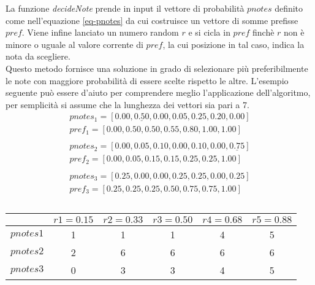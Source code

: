 La funzione \emph{decideNote} prende in input il vettore di probabilità
$pnotes$ definito come nell'equazione \ref{eq-pnotes} da cui costruisce
un vettore di somme prefisse $pref$. Viene infine lanciato un numero
random $r$ e si cicla in $pref$ finchè $r$ non è minore o uguale al
valore corrente di $pref$, la cui posizione in tal caso, indica la nota
da scegliere.\\
Questo metodo fornisce una soluzione in grado di selezionare più
preferibilmente le note con maggiore probabilità di essere scelte
rispetto le altre. L'esempio seguente può essere d'aiuto per comprendere
meglio l'applicazione dell'algoritmo, per semplicità si assume che la
lunghezza dei vettori sia pari a 7.
\begin{align*}
pnotes_1 = [0.00,\underline{0.50},0.00,0.05,0.25,0.20,0.00]\\
pref_1   = [0.00,0.50,0.50,0.55,0.80,1.00,1.00]\\\\
pnotes_2 = [0.00,0.05,0.10,0.00,0.10,0.00,\underline{0.75}]\\
pref_2   = [0.00,0.05,0.15,0.15,0.25,0.25,1.00]\\\\
pnotes_3 = [0.25,0.00,0.00,0.25,0.25,0.00,0.25]\\
pref_3   = [0.25,0.25,0.25,0.50,0.75,0.75,1.00]\\\\
\end{align*}
\begin{center}
  \begin{tabular}{ | c | c | c | c | c | c | }
	\hline
             & $r1 = 0.15$  & $r2 = 0.33$ & $r3 = 0.50$ & $r4 = 0.68$ &
$r5 = 0.88$ \\ \hline
    $pnotes1$  & 1 & 1 & 1 & 4 & 5 \\ \hline
    $pnotes2$  & 2 & 6 & 6 & 6 & 6 \\ \hline
    $pnotes3$  & 0 & 3 & 3 & 4 & 5 \\
	\hline
  \end{tabular}
\end{center}

